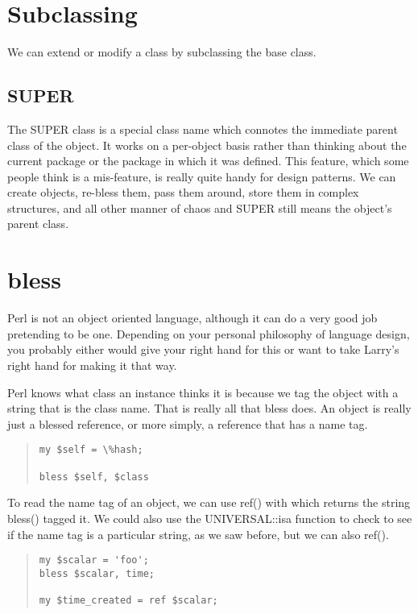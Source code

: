     \section{Subclassing}

We can extend or modify a class by subclassing the base class.

    \subsection{SUPER}

The SUPER class is a special class name which connotes the immediate
parent class of the object.  It works on a per-object basis rather
than thinking about the current package or the package in which
it was defined.  This feature, which some people think is a 
mis-feature, is really quite handy for design patterns.  We can create
objects, re-bless them, pass them around, store them in complex structures,
and all other manner of chaos and SUPER still means the object's
parent class.

    \section{bless}

Perl is not an object oriented language, although it can do a very
good job pretending to be one.  Depending on your personal philosophy 
of language design, you probably either would give your right hand
for this or want to take Larry's right hand for making it that way.

Perl knows what class an instance thinks it is because we tag
the object with a string that is the class name.  That is really
all that bless does.  An object is really just a blessed reference,
or more simply, a reference that has a name tag.

\begin{quote}    
\begin{verbatim}
my $self = \%hash;

bless $self, $class
\end{verbatim}
\end{quote}

To read the name tag of an object, we can use ref() with which returns
the string bless() tagged it.  We could also use the UNIVERSAL::isa
function to check to see if the name tag is a particular string, as
we saw before, but we can also ref().

\begin{quote}    
\begin{verbatim}
my $scalar = 'foo';
bless $scalar, time;

my $time_created = ref $scalar;
\end{verbatim}
\end{quote}

